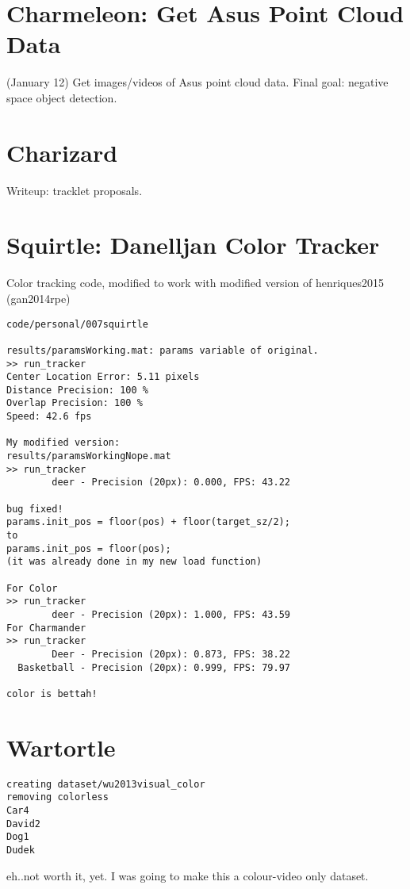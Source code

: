 \section{Charmeleon: Get Asus Point Cloud Data}
\label{exp:Charmeleon}
(January 12) Get images/videos of Asus point cloud data.
Final goal: negative space object detection.

\section{Charizard}
\label{exp:Charizard}
Writeup: tracklet proposals.
\section{Squirtle: Danelljan Color Tracker}
\label{exp:Squirtle}
Color tracking code, modified to work with modified version of henriques2015 (gan2014rpe)
\begin{lstlisting}
code/personal/007squirtle

results/paramsWorking.mat: params variable of original.
>> run_tracker
Center Location Error: 5.11 pixels
Distance Precision: 100 %
Overlap Precision: 100 %
Speed: 42.6 fps

My modified version:
results/paramsWorkingNope.mat
>> run_tracker
        deer - Precision (20px): 0.000, FPS: 43.22
        
bug fixed! 
params.init_pos = floor(pos) + floor(target_sz/2);
to
params.init_pos = floor(pos);
(it was already done in my new load function)

For Color
>> run_tracker
        deer - Precision (20px): 1.000, FPS: 43.59
For Charmander
>> run_tracker
        Deer - Precision (20px): 0.873, FPS: 38.22
  Basketball - Precision (20px): 0.999, FPS: 79.97

color is bettah!

\end{lstlisting}
\section{Wartortle}
\label{exp:Wartortle}
\begin{lstlisting}
creating dataset/wu2013visual_color
removing colorless
Car4
David2
Dog1
Dudek
\end{lstlisting}

eh..not worth it, yet. I was going to make this a colour-video only dataset.

